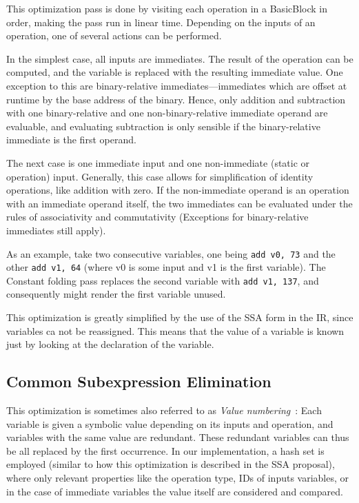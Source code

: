 \documentclass[course=eragp]{aspdoc}
\begin{document}
This optimization pass is done by visiting each operation in a BasicBlock in order, making the pass run in linear time.
Depending on the inputs of an operation, one of several actions can be performed.

In the simplest case, all inputs are immediates. The result of the operation can be computed, and the variable is
replaced with the resulting immediate value. One exception to this are binary-relative immediates---immediates which are
offset at runtime by the base address of the binary. Hence, only addition and subtraction with one binary-relative and
one non-binary-relative immediate operand are evaluable, and evaluating subtraction is only sensible if the
binary-relative immediate is the first operand.

The next case is one immediate input and one non-immediate (static or operation) input. Generally, this case allows for
simplification of identity operations, like addition with zero. If the non-immediate operand is an operation with an
immediate operand itself, the two immediates can be evaluated under the rules of associativity and commutativity
(Exceptions for binary-relative immediates still apply).


As an example, take two consecutive variables, one being \texttt{add v0, 73} and the other \texttt{add v1, 64} (where v0
is some input and v1 is the first variable). The Constant folding pass replaces the second variable with \texttt{add v1,
    137}, and consequently might render the first variable unused.

This optimization is greatly simplified by the use of the SSA form in the IR, since variables ca not be
reassigned. This means that the value of a variable is known just by looking at the declaration of the variable.

\subsection{Common Subexpression Elimination}

This optimization is sometimes also referred to as \textit{Value numbering}~\cite{ssa_proposal}: Each variable is
given a symbolic value depending on its inputs and operation, and variables with the same value are redundant. These
redundant variables can thus be all replaced by the first occurrence. In our implementation, a hash set is employed
(similar to how this optimization is described in the SSA proposal), where only relevant properties like the operation
type, IDs of inputs variables, or in the case of immediate variables the value itself are considered and compared.
\end{document}
